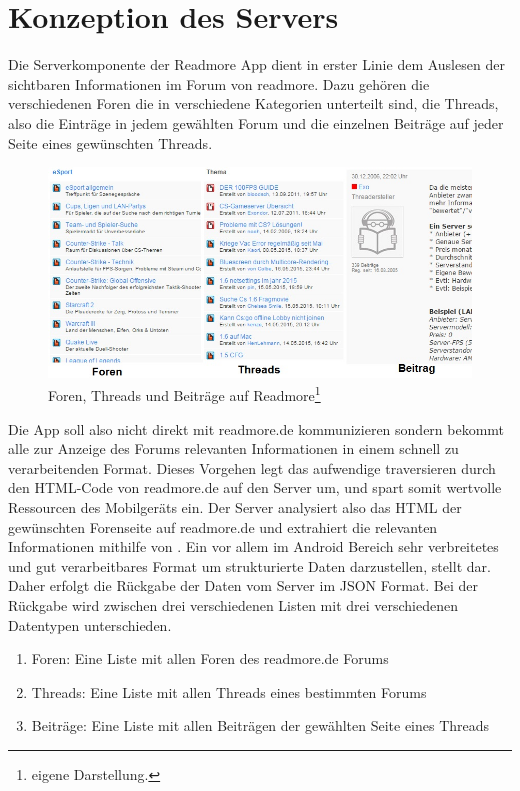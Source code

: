 \section{Konzeption des Servers}
Die Serverkomponente der Readmore App dient in erster Linie dem Auslesen der
sichtbaren Informationen im Forum von readmore. Dazu gehören die verschiedenen
Foren die in verschiedene Kategorien unterteilt sind, die Threads, also die
Einträge in jedem gewählten Forum und die einzelnen Beiträge auf jeder Seite
eines gewünschten Threads. 
\begin{figure}[!htbp]
\centering
\includegraphics[width=\textwidth]{Bilder/ftb.jpg}
\caption[Foren, Threads und Beiträge auf Readmore]{Foren, Threads und Beiträge auf Readmore\protect\footnote{eigene Darstellung.} }
\label{dminfo}
\end{figure}
Die App soll also nicht direkt mit readmore.de kommunizieren sondern bekommt
alle zur Anzeige des Forums relevanten Informationen in einem schnell zu
verarbeitenden Format. Dieses Vorgehen legt das aufwendige traversieren durch
den HTML-Code von readmore.de auf den Server um, und spart somit wertvolle
Ressourcen des Mobilgeräts ein. Der Server analysiert also das HTML der
gewünschten Forenseite auf readmore.de und extrahiert die relevanten
Informationen mithilfe von . Ein vor allem im Android Bereich
sehr verbreitetes und gut verarbeitbares Format um strukturierte Daten darzustellen, 
stellt  dar. Daher erfolgt die Rückgabe der Daten vom Server 
im JSON Format. Bei der Rückgabe wird zwischen drei
verschiedenen Listen mit drei verschiedenen Datentypen unterschieden. \\
\begin{enumerate}
  \item Foren: Eine Liste mit allen Foren des readmore.de Forums
  \item Threads: Eine Liste mit allen Threads eines bestimmten Forums
  \item Beiträge: Eine Liste mit allen Beiträgen der gewählten Seite eines
  Threads
\end{enumerate}
